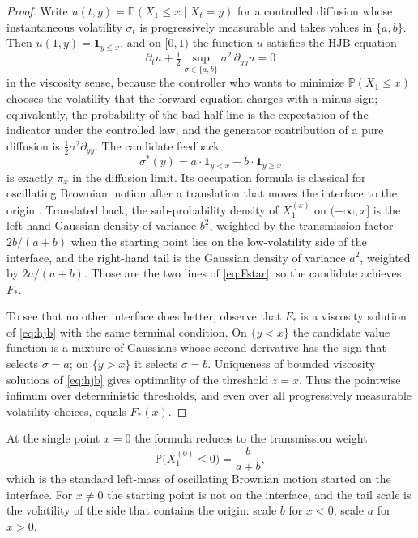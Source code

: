 \documentclass[11pt]{article}
\theoremstyle{definition}
\newcommand{\Prob}{\mathbb{P}}
\begin{document}
\begin{proof}
Write \(u(t,y)=\Prob(X_1\le x\mid X_t=y)\) for a controlled diffusion whose instantaneous volatility \(\sigma_t\) is progressively measurable and takes values in \(\{a,b\}\).
Then \(u(1,y)=\mathbf 1_{y\le x}\), and on \([0,1)\) the function \(u\) satisfies the HJB equation
\begin{equation}
  \label{eq:hjb}
  \partial_t u+\tfrac12\sup_{\sigma\in\{a,b\}}\sigma^2\,\partial_{yy}u=0
\end{equation}
in the viscosity sense, because the controller who wants to minimize \(\Prob(X_1\le x)\) chooses the volatility that the forward equation charges with a minus sign; equivalently, the probability of the bad half-line is the expectation of the indicator under the controlled law, and the generator contribution of a pure diffusion is \(\tfrac12\sigma^2\partial_{yy}\).
The candidate feedback
\[
  \sigma^*(y)=a\cdot\mathbf 1_{y<x}+b\cdot\mathbf 1_{y\ge x}
\]
is exactly \(\pi_{x}\) in the diffusion limit.
Its occupation formula is classical for oscillating Brownian motion after a translation that moves the interface to the origin
\cite{KeilsonWellner,Lejay2006}.
Translated back, the sub-probability density of \(X^{(x)}_1\) on \((-\infty,x]\) is the left-hand Gaussian density of variance \(b^2\), weighted by the transmission factor \(2b/(a+b)\) when the starting point lies on the low-volatility side of the interface, and the right-hand tail is the Gaussian density of variance \(a^2\), weighted by \(2a/(a+b)\).
Those are the two lines of \eqref{eq:Fstar}, so the candidate achieves \(F_*\).

To see that no other interface does better, observe that \(F_*\) is a viscosity solution of \eqref{eq:hjb} with the same terminal condition.
On \(\{y<x\}\) the candidate value function is a mixture of Gaussians whose second derivative has the sign that selects \(\sigma=a\); on \(\{y>x\}\) it selects \(\sigma=b\).
Uniqueness of bounded viscosity solutions of \eqref{eq:hjb} gives optimality of the threshold \(z=x\).
Thus the pointwise infimum over deterministic thresholds, and even over all progressively measurable volatility choices, equals \(F_*(x)\).
\end{proof}

At the single point \(x=0\) the formula reduces to the transmission weight
\[
  \Prob\bigl(X^{(0)}_1\le 0\bigr)=\frac{b}{a+b},
\]
which is the standard left-mass of oscillating Brownian motion started on the interface.
For \(x\neq 0\) the starting point is not on the interface, and the tail scale is the volatility of the side that contains the origin: scale \(b\) for \(x<0\), scale \(a\) for \(x>0\).
\end{document}
